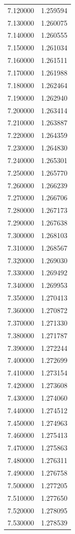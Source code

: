 \begin{tabular}{rr}
7.120000 & 1.259594 \\
7.130000 & 1.260075 \\
7.140000 & 1.260555 \\
7.150000 & 1.261034 \\
7.160000 & 1.261511 \\
7.170000 & 1.261988 \\
7.180000 & 1.262464 \\
7.190000 & 1.262940 \\
7.200000 & 1.263414 \\
7.210000 & 1.263887 \\
7.220000 & 1.264359 \\
7.230000 & 1.264830 \\
7.240000 & 1.265301 \\
7.250000 & 1.265770 \\
7.260000 & 1.266239 \\
7.270000 & 1.266706 \\
7.280000 & 1.267173 \\
7.290000 & 1.267638 \\
7.300000 & 1.268103 \\
7.310000 & 1.268567 \\
7.320000 & 1.269030 \\
7.330000 & 1.269492 \\
7.340000 & 1.269953 \\
7.350000 & 1.270413 \\
7.360000 & 1.270872 \\
7.370000 & 1.271330 \\
7.380000 & 1.271787 \\
7.390000 & 1.272244 \\
7.400000 & 1.272699 \\
7.410000 & 1.273154 \\
7.420000 & 1.273608 \\
7.430000 & 1.274060 \\
7.440000 & 1.274512 \\
7.450000 & 1.274963 \\
7.460000 & 1.275413 \\
7.470000 & 1.275863 \\
7.480000 & 1.276311 \\
7.490000 & 1.276758 \\
7.500000 & 1.277205 \\
7.510000 & 1.277650 \\
7.520000 & 1.278095 \\
7.530000 & 1.278539 \\

\end{tabular}
